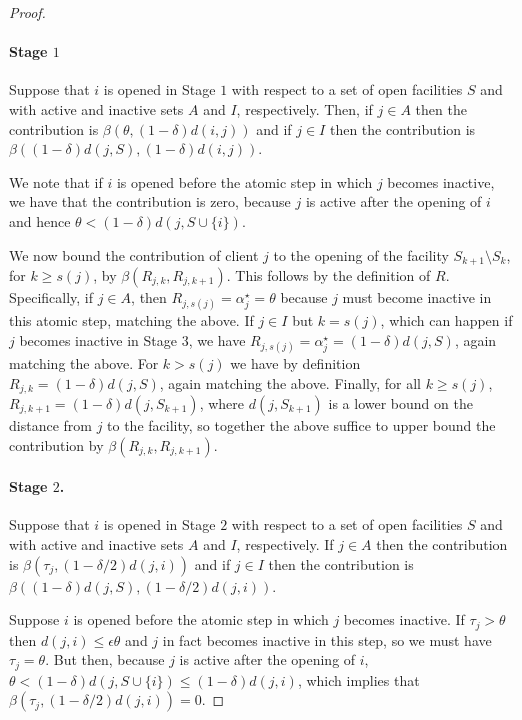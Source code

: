 \begin{proof}
    \paragraph{Stage $1$}
    Suppose that $i$ is opened in Stage $1$ with respect to a set of open facilities $S$ and with active and inactive sets $A$ and $I$, respectively.
    Then, if $j \in A$ then the contribution is $\beta(\theta, (1-\delta)d(i,j))$ and if $j \in I$ then the contribution is $\beta((1-\delta)d(j,S), (1-\delta)d(i, j))$.
    
    We note that if $i$ is opened before the atomic step in which $j$ becomes inactive, we have that the contribution is zero, because $j$ is active after the opening of $i$ and hence $\theta < (1-\delta)d(j,S \cup \{i\})$.

    We now bound the contribution of client $j$ to the opening of the facility $S_{k+1} \setminus S_{k}$, for $k \geq s(j)$, by $\beta(R_{j,k}, R_{j,k+1})$.
    This follows by the definition of $R$.
    Specifically, if $j \in A$, then $R_{j,s(j)} = \alpha_j^\star = \theta$ because $j$ must become inactive in this atomic step, matching the above.
    If $j \in I$ but $k = s(j)$, which can happen if $j$ becomes inactive in Stage 3, we have $R_{j,s(j)} = \alpha_j^\star = (1-\delta)d(j, S)$, again matching the above.
    For $k > s(j)$ we have by definition $R_{j, k} = (1-\delta)d(j, S)$, again matching the above.
    Finally, for all $k \geq s(j)$, $R_{j,k+1} = (1-\delta) d(j, S_{k+1})$, where $d(j, S_{k+1})$ is a lower bound on the distance from $j$ to the facility, so together the above suffice to upper bound the contribution by $\beta(R_{j,k}, R_{j,k+1})$.

    \paragraph{Stage $2$.}
    Suppose that $i$ is opened in Stage $2$ with respect to a set of open facilities $S$ and with active and inactive sets $A$ and $I$, respectively.
    If $j \in A$ then the contribution is $\beta(\tau_j, (1-\delta/2)d(j,i))$ and if $j \in I$ then the contribution is $\beta((1-\delta)d(j, S), (1-\delta/2) d(j, i))$.

    Suppose $i$ is opened before the atomic step in which $j$ becomes inactive.
    If $\tau_j > \theta$ then $d(j, i) \leq \epsilon \theta$ and $j$ in fact becomes inactive in this step, so we must have $\tau_j = \theta$.
    But then, because $j$ is active after the opening of $i$, $\theta < (1-\delta) d(j, S \cup\{i\}) \leq (1-\delta) d(j, i)$, which implies that $\beta(\tau_j, (1-\delta/2)d(j,i)) = 0$.


\end{proof}
